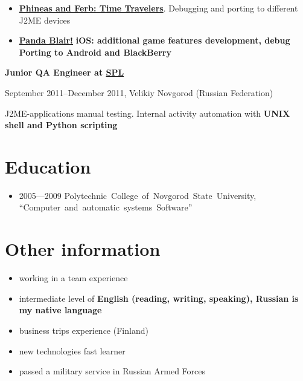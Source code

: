 \begin{itemize}

\setlength{\itemindent}{20pt}
\item
    \href{http://java.mob.org/game/phineas\_and\_ferb\_time\_travelers.html}
        {\bfseries Phineas and Ferb: Time Travelers\mdseries}.
        Debugging and porting to different J2ME devices
\item
    \href{https://itunes.apple.com/us/app/panda-blair!/id500995558?mt=8}
        {\bfseries Panda Blair!\mdseries}
        \bfseries iOS\mdseries: additional game features development, debug
        Porting to \bfseries Android \mdseries and \bfseries BlackBerry\mdseries
\end{itemize}

\vspace{5pt}

{
\fontsize{12pt}{12pt}\selectfont
\bfseries Junior QA Engineer at
\href{http://spl.co}{\bfseries SPL\mdseries}
\mdseries
}

{
\fontsize{9pt}{8pt}\selectfont
September 2011--December 2011, Velikiy Novgorod (Russian Federation)
}

J2ME-applications manual testing. Internal activity automation with
\bfseries UNIX shell \mdseries and \bfseries Python \mdseries scripting

\section{Education}
\begin{itemize}
\item 2005---2009 Polytechnic~College~of~Novgorod~State~University,
``Computer~and~automatic~systems~Software''
\end{itemize}

\section{Other information}
\begin{itemize}
\item working in a team experience
\item intermediate level of \bfseries English \mdseries (reading, writing, speaking),
Russian is my native language
\item business trips experience (Finland)
\item new technologies fast learner
\item passed a military service in Russian Armed Forces
\end{itemize}

